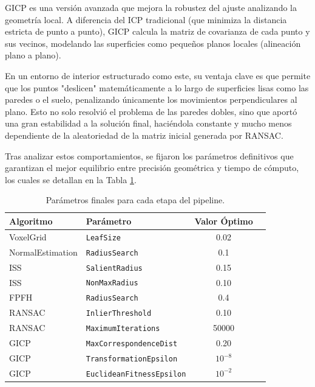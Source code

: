 \documentclass[11pt,letterpaper, onecolumn]{article}
\begin{document}
GICP es una versión avanzada que mejora la robustez del ajuste analizando la geometría local. A diferencia del ICP tradicional (que minimiza la distancia estricta de punto a punto), GICP calcula la matriz de covarianza de cada punto y sus vecinos, modelando las superficies como pequeños planos locales (alineación plano a plano). 

En un entorno de interior estructurado como este, su ventaja clave es que permite que los puntos "deslicen" matemáticamente a lo largo de superficies lisas como las paredes o el suelo, penalizando únicamente los movimientos perpendiculares al plano. Esto no solo resolvió el problema de las paredes dobles, sino que aportó una gran estabilidad a la solución final, haciéndola constante y mucho menos dependiente de la aleatoriedad de la matriz inicial generada por RANSAC.

Tras analizar estos comportamientos, se fijaron los parámetros definitivos que garantizan el mejor equilibrio entre precisión geométrica y tiempo de cómputo, los cuales se detallan en la Tabla \ref{tab:parametros}.

\begin{table}[H]
    \centering
    \begin{tabular}{llcp{6cm}} 
    \toprule
    \textbf{Algoritmo} & \textbf{Parámetro} & \textbf{Valor Óptimo}  \\
    \midrule
    VoxelGrid & \texttt{LeafSize} & 0.02   \\
    \addlinespace %
    NormalEstimation & \texttt{RadiusSearch} & 0.1  \\
    \addlinespace
    ISS & \texttt{SalientRadius} & 0.15   \\
    ISS & \texttt{NonMaxRadius} & 0.10   \\
    \addlinespace
    FPFH & \texttt{RadiusSearch} & 0.4 \\
    \addlinespace
    RANSAC & \texttt{InlierThreshold} & 0.10   \\
    RANSAC & \texttt{MaximumIterations} & 50000 \\
    \addlinespace
    GICP & \texttt{MaxCorrespondenceDist} & 0.20   \\
    GICP & \texttt{TransformationEpsilon} & $10^{-8}$ \\
    GICP & \texttt{EuclideanFitnessEpsilon} & $10^{-2}$ \\
    \bottomrule
    \end{tabular}
    \caption{Parámetros finales para cada etapa del pipeline.}
    \label{tab:parametros}
\end{table}
\end{document}
